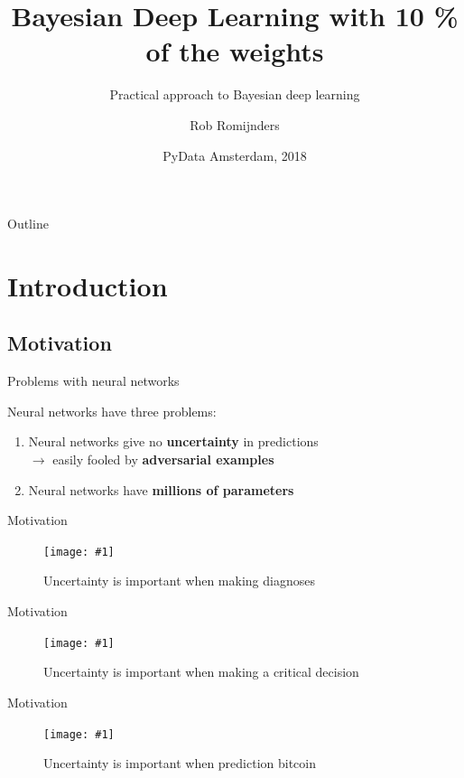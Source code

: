 \documentclass{beamer}
\title{Bayesian Deep Learning with 10 \% of the weights}
\subtitle{Practical approach to Bayesian deep learning}
\author{Rob Romijnders}
\institute[Universities of Somewhere and Elsewhere] %
{
  \mdlink{robromijnders.github.io}{http://robromijnders.github.io/}}
\date{PyData Amsterdam, 2018}
\newcommand{\fitfigure}[1]{\centering\texttt{[image: \#1]}}
\begin{document}
\begin{frame}
	\titlepage
\end{frame}

\begin{frame}{Outline}
	\tableofcontents
\end{frame}

\section{Introduction}

\subsection{Motivation}

\begin{frame}{Problems with neural networks}
	\centerline{Neural networks have three problems:}
	\begin{enumerate}
		\item Neural networks give no \textbf{uncertainty} in predictions \\ 
		      \quad \quad \small{ $\rightarrow$ easily fooled by \textbf{adversarial examples}}
		\item Neural networks have \textbf{millions of parameters}
	\end{enumerate}
\end{frame}

\begin{frame}{Motivation}
	\begin{figure}
		\fitfigure{im/xray.png}
		\caption{Uncertainty is important when making diagnoses}
	\end{figure}
\end{frame}

\begin{frame}{Motivation}
	\begin{figure}
		\fitfigure{im/autonomous_driving.jpg}
		\caption{Uncertainty is important when making a critical decision}
	\end{figure}
\end{frame}

\begin{frame}{Motivation}
	\begin{figure}
		\fitfigure{im/bitcoin.png}
		\caption{Uncertainty is important when prediction bitcoin}
	\end{figure}
\end{frame}
\end{document}
